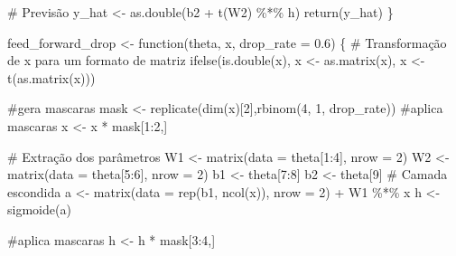 \documentclass[
  a4paperpaper,
]{article}
\newenvironment{Shaded}{\begin{snugshade}}{\end{snugshade}}
\newcommand{\AttributeTok}[1]{\textcolor[rgb]{0.40,0.45,0.13}{#1}}
\newcommand{\CommentTok}[1]{\textcolor[rgb]{0.37,0.37,0.37}{#1}}
\newcommand{\ControlFlowTok}[1]{\textcolor[rgb]{0.00,0.23,0.31}{#1}}
\newcommand{\DecValTok}[1]{\textcolor[rgb]{0.68,0.00,0.00}{#1}}
\newcommand{\FloatTok}[1]{\textcolor[rgb]{0.68,0.00,0.00}{#1}}
\newcommand{\FunctionTok}[1]{\textcolor[rgb]{0.28,0.35,0.67}{#1}}
\newcommand{\NormalTok}[1]{\textcolor[rgb]{0.00,0.23,0.31}{#1}}
\newcommand{\OtherTok}[1]{\textcolor[rgb]{0.00,0.23,0.31}{#1}}
\newcommand{\SpecialCharTok}[1]{\textcolor[rgb]{0.37,0.37,0.37}{#1}}
\begin{document}
\begin{Shaded}
\begin{Highlighting}[]
  
  \CommentTok{\# Previsão}
\NormalTok{  y\_hat }\OtherTok{\textless{}{-}} \FunctionTok{as.double}\NormalTok{(b2 }\SpecialCharTok{+} \FunctionTok{t}\NormalTok{(W2) }\SpecialCharTok{\%*\%}\NormalTok{ h)}
  \FunctionTok{return}\NormalTok{(y\_hat)}
\NormalTok{\}}

\NormalTok{feed\_forward\_drop }\OtherTok{\textless{}{-}} \ControlFlowTok{function}\NormalTok{(theta, x, }\AttributeTok{drop\_rate =} \FloatTok{0.6}\NormalTok{) \{}
\CommentTok{\# Transformação de x para um formato de matriz}
  \FunctionTok{ifelse}\NormalTok{(}\FunctionTok{is.double}\NormalTok{(x), x }\OtherTok{\textless{}{-}} \FunctionTok{as.matrix}\NormalTok{(x), x }\OtherTok{\textless{}{-}} \FunctionTok{t}\NormalTok{(}\FunctionTok{as.matrix}\NormalTok{(x)))}
  
  \CommentTok{\#gera mascaras}
\NormalTok{  mask }\OtherTok{\textless{}{-}} \FunctionTok{replicate}\NormalTok{(}\FunctionTok{dim}\NormalTok{(x)[}\DecValTok{2}\NormalTok{],}\FunctionTok{rbinom}\NormalTok{(}\DecValTok{4}\NormalTok{, }\DecValTok{1}\NormalTok{, drop\_rate))}
  \CommentTok{\#aplica mascaras}
\NormalTok{  x }\OtherTok{\textless{}{-}}\NormalTok{ x }\SpecialCharTok{*}\NormalTok{ mask[}\DecValTok{1}\SpecialCharTok{:}\DecValTok{2}\NormalTok{,]}
  
  \CommentTok{\# Extração dos parâmetros}
\NormalTok{  W1 }\OtherTok{\textless{}{-}} \FunctionTok{matrix}\NormalTok{(}\AttributeTok{data =}\NormalTok{ theta[}\DecValTok{1}\SpecialCharTok{:}\DecValTok{4}\NormalTok{], }\AttributeTok{nrow =} \DecValTok{2}\NormalTok{)}
\NormalTok{  W2 }\OtherTok{\textless{}{-}} \FunctionTok{matrix}\NormalTok{(}\AttributeTok{data =}\NormalTok{ theta[}\DecValTok{5}\SpecialCharTok{:}\DecValTok{6}\NormalTok{], }\AttributeTok{nrow =} \DecValTok{2}\NormalTok{)}
\NormalTok{  b1 }\OtherTok{\textless{}{-}}\NormalTok{ theta[}\DecValTok{7}\SpecialCharTok{:}\DecValTok{8}\NormalTok{]}
\NormalTok{  b2 }\OtherTok{\textless{}{-}}\NormalTok{ theta[}\DecValTok{9}\NormalTok{]}
  \CommentTok{\# Camada escondida}
\NormalTok{  a }\OtherTok{\textless{}{-}} \FunctionTok{matrix}\NormalTok{(}\AttributeTok{data =} \FunctionTok{rep}\NormalTok{(b1, }\FunctionTok{ncol}\NormalTok{(x)), }\AttributeTok{nrow =} \DecValTok{2}\NormalTok{) }\SpecialCharTok{+}\NormalTok{ W1 }\SpecialCharTok{\%*\%}\NormalTok{ x}
\NormalTok{  h }\OtherTok{\textless{}{-}} \FunctionTok{sigmoide}\NormalTok{(a)}
  
  \CommentTok{\#aplica mascaras}
\NormalTok{  h }\OtherTok{\textless{}{-}}\NormalTok{ h }\SpecialCharTok{*}\NormalTok{ mask[}\DecValTok{3}\SpecialCharTok{:}\DecValTok{4}\NormalTok{,]  }
  

\end{Highlighting}
\end{Shaded}
\end{document}
